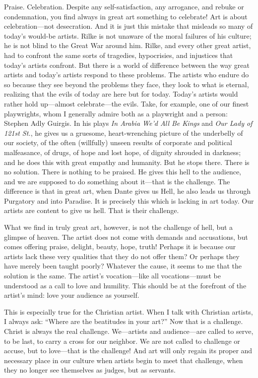 \documentclass[letterpaper]{article}
\begin{document}
Praise. Celebration. Despite any self-satisfaction, any arrogance, and
rebuke or condemnation, you find always in great art something to
celebrate! Art is about celebration---not desecration. And it is just
this mistake that misleads so many of today's would-be artists. Rilke
is not unaware of the moral failures of his culture; he is not blind
to the Great War around him. Rilke, and every other great artist, had
to confront the same sorts of tragedies, hypocrisies, and injustices
that today's artists confront. But there is a world of difference
between the way great artists and today's artists respond to these
problems. The artists who endure do so because they see beyond the
problems they face, they look to what is eternal, realizing that the
evils of today are here but for today. Today's artists would rather
hold up---almost celebrate---the evils. Take, for example, one of our
finest playwrights, whom I generally admire both as a playwright and a
person: Stephen Adly Guirgis. In his plays \emph{In Arabia We'd All Be
Kings} and \emph{Our Lady of 121st St.}, he gives us a gruesome,
heart-wrenching picture of the underbelly of our society, of the often
(willfully) unseen results of corporate and political malfeasance, of
drugs, of hope and lost hope, of dignity shrouded in darkness; and he
does this with great empathy and humanity. But he stops there. There
is no solution. There is nothing to be praised. He gives this hell to
the audience, and we are supposed to do something about it---that is
the challenge. The difference is that in great art, when Dante gives
us Hell, he also leads us through Purgatory and into Paradise. It is
precisely this which is lacking in art today. Our artists are content
to give us hell. That is their challenge.

What we find in truly great art, however, is not the challenge of
hell, but a glimpse of heaven. The artist does not come with demands
and accusations, but comes offering praise, delight, beauty, hope,
truth! Perhaps it is because our artists lack these very qualities
that they do not offer them? Or perhaps they have merely been taught
poorly? Whatever the cause, it seems to me that the solution is the
same. The artist's vocation---like all vocations---must be understood
as a call to love and humility. This should be at the forefront of the
artist's mind: love your audience as yourself.

This is especially true for the Christian artist. When I talk with
Christian artists, I always ask: ``Where are the beatitudes in your
art?'' Now that is a challenge. Christ is always the real
challenge. We---artists and audience---are called to serve, to be
last, to carry a cross for our neighbor. We are not called to
challenge or accuse, but to love---that is the challenge! And art will
only regain its proper and necessary place in our culture when artists
begin to meet that challenge, when they no longer see themselves as
judges, but as servants.
\end{document}
